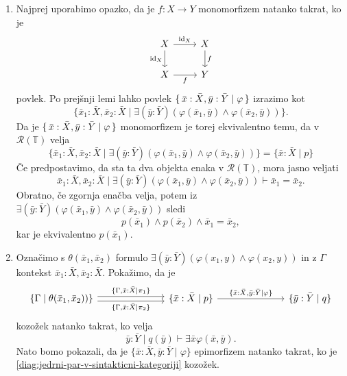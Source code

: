 \documentclass[../kategoricna_logika.tex]{subfiles}
\begin{document}
  \begin{dokaz}
    \begin{enumerate}[label=(\roman*)]
    \item Najprej uporabimo opazko, da je $f : X \to Y$
      monomorfizem natanko takrat, ko je
      \begin{equation*}
        \begin{tikzcd}
          X \ar[d, " \mathrm{id}_X"'] \ar[r, " \mathrm{id}_X"] & X \ar[d, "f"] \\
          X \ar[r, "f"'] & Y
        \end{tikzcd}
      \end{equation*}
      povlek. Po prejšnji lemi lahko povlek $\lbrace\,\bar{x}:\bar{X},\bar{y}:\bar{Y} \mid \varphi\,\rbrace$
      izrazimo kot
      \[ \{ \bar{x}_{1}:\bar{X} ,\bar{x}_{2}:\bar{X}  \mid \exists (\bar{y}:\bar{Y})(\varphi(\bar{x}_1,\bar{y}) \land
        \varphi(\bar{x}_2,\bar{y})) \}.\]
      Da je $\lbrace\,\bar{x}:\bar{X},\bar{y}:\bar{Y} \mid \varphi\,\rbrace$
      monomorfizem je
      torej ekvivalentno temu, da v $\mathcal{R}(\mathbb{T})$ velja
      \[ \{ \bar{x}_{1}:\bar{X} ,\bar{x}_{2}:\bar{X}  \mid \exists (\bar{y}:\bar{Y})(\varphi(\bar{x}_1,\bar{y}) \land
        \varphi(\bar{x}_2,\bar{y})) \} = \{\bar{x}:\bar{X} \mid p\} \]
      Če predpostavimo, da sta
      ta dva objekta enaka v $\mathcal{R}(\mathbb{T})$, mora jasno
      veljati
    $$\bar{x}_1:\bar{X},\bar{x}_2:\bar{X} \mid \exists (\bar{y}:\bar{Y}) \left( \varphi(\bar{x}_1,\bar{y}) \wedge \varphi(\bar{x}_2,\bar{y}) \right) \vdash \bar{x}_1 = \bar{x}_2.$$
    Obratno, če zgornja enačba velja, potem iz
    $\exists (\bar{y}:\bar{Y})(\varphi(\bar{x}_1,\bar{y}) \land \varphi(\bar{x}_2,\bar{y}))$ sledi
    \[p(\bar{x}_1) \land p(\bar{x}_2) \land \bar{x}_1 = \bar{x}_2,\] kar je ekvivalentno
    $p(\bar{x}_1)$.

  \item Označimo s $\theta(\bar{x}_{1},\bar{x}_2)$ formulo
    $\exists (\bar{y}:\bar{Y})(\varphi(x_1,y) \land \varphi(x_2,y))$ in z $\Gamma$ kontekst
    $\bar{x}_1:\bar{X},\bar{x}_2:\bar{X}$.
    Pokažimo, da je
    \begin{equation}\label{diag:jedrni-par-v-sintakticni-kategoriji}
      \begin{tikzcd}[column sep =7em]
        \{ \Gamma \mid \theta(\bar{x}_1,\bar{x}_2))
        \} \ar[r, shift left, "{\{\Gamma ,\bar{x}:\bar{X} \mid \pi_1\}}"]
        \ar[r, shift right, "{\{\Gamma,\bar{x}:\bar{X} \mid \pi_2\}}"'] &
        \{\bar{x}:\bar{X}  \mid p\} \ar[r, "{\{\bar{x}:\bar{X},\bar{y}:\bar{Y} \mid \varphi \}}"] &
        \{\bar{y}:\bar{Y} \mid q\}
      \end{tikzcd}
    \end{equation}
    kozožek natanko takrat, ko velja
    $$\bar{y}:\bar{Y} \mid q(\bar{y}) \vdash \exists \bar{x} \varphi(\bar{x},\bar{y}).$$
    Nato bomo pokazali, da je $\{\bar{x}:\bar{X},\bar{y}:\bar{Y} \mid \varphi \}$ epimorfizem natanko
    takrat, ko je \eqref{diag:jedrni-par-v-sintakticni-kategoriji}
    kozožek.



\end{enumerate}
\end{dokaz}
\end{document}
